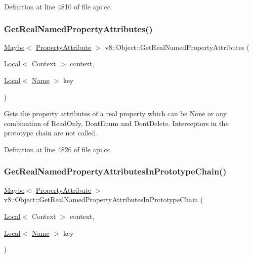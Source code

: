 Definition at line 4810 of file api.\+cc.

\mbox{\label{classv8_1_1Object_aa928085fd056cf4864b3860dbd31472e}} 
\subsubsection{\texorpdfstring{Get\+Real\+Named\+Property\+Attributes()}{GetRealNamedPropertyAttributes()}}
{\footnotesize\ttfamily \mbox{\hyperlink{classv8_1_1Maybe}{Maybe}}$<$ \mbox{\hyperlink{namespacev8_a05f25f935e108a1ea2d150e274602b87}{Property\+Attribute}} $>$ v8\+::\+Object\+::\+Get\+Real\+Named\+Property\+Attributes (\begin{DoxyParamCaption}\item[{\mbox{\hyperlink{classv8_1_1Local}{Local}}$<$ Context $>$}]{context,  }\item[{\mbox{\hyperlink{classv8_1_1Local}{Local}}$<$ \mbox{\hyperlink{classv8_1_1Name}{Name}} $>$}]{key }\end{DoxyParamCaption})}

Gets the property attributes of a real property which can be None or any combination of Read\+Only, Dont\+Enum and Dont\+Delete. Interceptors in the prototype chain are not called. 

Definition at line 4826 of file api.\+cc.

\mbox{\label{classv8_1_1Object_a06a7dd82554ee4e82a6c54f7fff6b4bd}} 
\subsubsection{\texorpdfstring{Get\+Real\+Named\+Property\+Attributes\+In\+Prototype\+Chain()}{GetRealNamedPropertyAttributesInPrototypeChain()}}
{\footnotesize\ttfamily \mbox{\hyperlink{classv8_1_1Maybe}{Maybe}}$<$ \mbox{\hyperlink{namespacev8_a05f25f935e108a1ea2d150e274602b87}{Property\+Attribute}} $>$ v8\+::\+Object\+::\+Get\+Real\+Named\+Property\+Attributes\+In\+Prototype\+Chain (\begin{DoxyParamCaption}\item[{\mbox{\hyperlink{classv8_1_1Local}{Local}}$<$ Context $>$}]{context,  }\item[{\mbox{\hyperlink{classv8_1_1Local}{Local}}$<$ \mbox{\hyperlink{classv8_1_1Name}{Name}} $>$}]{key }\end{DoxyParamCaption})}

